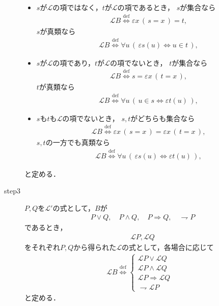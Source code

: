 \begin{description}
\begin{itemize}
				\item $s$が$\mathcal{L}$の項ではなく，$t$が$\mathcal{L}$の項であるとき，
					$s$が集合なら
					\begin{align}
						\mathcal{L}B \overset{\mathrm{def}}{\Longleftrightarrow}
						\varepsilon x\, (\, s=x\, ) = t,
					\end{align}
					$s$が真類なら
					\begin{align}
						\mathcal{L}B \overset{\mathrm{def}}{\Longleftrightarrow}
						\forall u\, \left(\, \varepsilon s(u) \Longleftrightarrow u \in t\, \right),
					\end{align}
				
				\item $s$が$\mathcal{L}$の項であり，$t$が$\mathcal{L}$の項でないとき，
					$t$が集合なら
					\begin{align}
						\mathcal{L}B \overset{\mathrm{def}}{\Longleftrightarrow}
						s = \varepsilon x\, (\, t=x\, ),
					\end{align}
					$t$が真類なら
					\begin{align}
						\mathcal{L}B \overset{\mathrm{def}}{\Longleftrightarrow}
						\forall u\, \left(\, u \in s \Longleftrightarrow \varepsilon t(u)\, \right),
					\end{align}
					
				\item $s$も$t$も$\mathcal{L}$の項でないとき，
					$s,t$がどちらも集合なら
					\begin{align}
						\mathcal{L}B \overset{\mathrm{def}}{\Longleftrightarrow}
						\varepsilon x\, (\, s=x\, ) = \varepsilon x\, (\, t=x\, ),
					\end{align}
					$s,t$の一方でも真類なら
					\begin{align}
						\mathcal{L}B \overset{\mathrm{def}}{\Longleftrightarrow}
						\forall u\, \left(\, \varepsilon s(u) \Longleftrightarrow \varepsilon t(u)\, \right),
					\end{align}
			\end{itemize}
			と定める．
			
		\item[step3] $P,Q$を$\mathcal{L}'$の式として，$B$が
			\begin{align}
				P \vee Q,\quad P \wedge Q,\quad P \Longrightarrow Q,\quad \rightharpoondown P
			\end{align}
			であるとき，
			\begin{align}
				\mathcal{L}P,\mathcal{L}Q
			\end{align}
			をそれぞれ$P,Q$から得られた$\mathcal{L}$の式として，各場合に応じて
			\begin{align}
				\mathcal{L}B \overset{\mathrm{def}}{\Longleftrightarrow}
				\begin{cases}
					\mathcal{L}P \vee \mathcal{L}Q & \\
					\mathcal{L}P \wedge \mathcal{L}Q & \\
					\mathcal{L}P \Longrightarrow \mathcal{L}Q & \\
					\rightharpoondown \mathcal{L}P &
				\end{cases}
			\end{align}
			と定める．
	\end{description}
	
